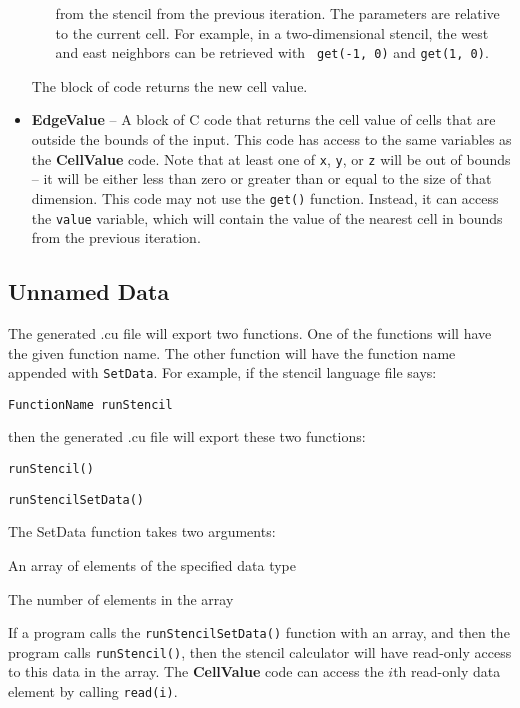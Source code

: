 \documentclass{styles/sig-alternate}
\begin{document}
\begin{itemize}
\begin{itemize}
  from the stencil from the previous iteration.  The parameters are
  relative to the current cell.  For example, in a two-dimensional
  stencil, the west and east neighbors can be retrieved with {\tt
    get(-1, 0)} and {\tt get(1, 0)}.
\end{itemize}
The block of code returns the new cell value.
\item {\bf EdgeValue} -- A block of C code that returns the cell value
  of cells that are outside the bounds of the input.  This code has
  access to the same variables as the {\bf CellValue} code.  Note that
  at least one of {\tt x}, {\tt y}, or {\tt z} will be out of bounds
  -- it will be either less than zero or greater than or equal to the
  size of that dimension.  This code may not use the {\tt get()}
  function.  Instead, it can access the {\tt value} variable, which
  will contain the value of the nearest cell in bounds from the
  previous iteration.
\end{itemize}

\subsection{Unnamed Data}

The generated .cu file will export two functions.  One of the
functions will have the given function name.  The other function will
have the function name appended with {\tt SetData}.  For example, if
the stencil language file says:
\begin{verbatim}
FunctionName runStencil
\end{verbatim}
then the generated .cu file will export these two functions:
\begin{itemize*}
\item {\tt runStencil()}
\item {\tt runStencilSetData()}
\end{itemize*}

\noindent The SetData function takes two arguments:
\begin{enumerate*}
\item An array of elements of the specified data type
\item The number of elements in the array
\end{enumerate*}
If a program calls the {\tt runStencilSetData()} function with an
array, and then the program calls {\tt runStencil()}, then the stencil
calculator will have read-only access to this data in the array.  The
{\bf CellValue} code can access the $i$th read-only data element by
calling {\tt read(i)}.
\end{document}

